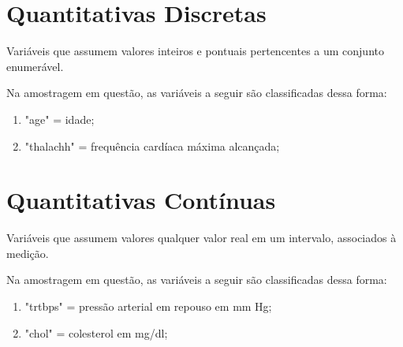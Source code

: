     \section{Quantitativas Discretas}

    Variáveis que assumem valores inteiros e pontuais pertencentes a um conjunto enumerável. 

    Na amostragem em questão, as variáveis a seguir são classificadas dessa forma: 

    \begin{enumerate}[label={\alph*)}]
        \addtolength{\itemindent}{1.25cm}
        \item "age" = idade;
        \item "thalachh" = frequência cardíaca máxima alcançada;
    \end{enumerate}

    \section{Quantitativas Contínuas}

    Variáveis que assumem valores qualquer valor real em um intervalo, associados à medição. 

    Na amostragem em questão, as variáveis a seguir são classificadas dessa forma: 

    \begin{enumerate}[label={\alph*)}]
        \addtolength{\itemindent}{1.25cm}
        \item "trtbps" = pressão arterial em repouso em mm Hg;
        \item "chol" = colesterol em mg/dl;
    \end{enumerate}

    \nocite{classificacao}